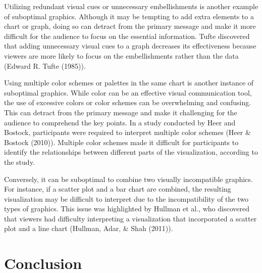 \documentclass[print]{nuthesis}
\begin{document}
Utilizing redundant visual cues or unnecessary embellishments is another example of suboptimal graphics.
Although it may be tempting to add extra elements to a chart or graph, doing so can detract from the primary message and make it more difficult for the audience to focus on the essential information.
Tufte discovered that adding unnecessary visual cues to a graph decreases its effectiveness because viewers are more likely to focus on the embellishments rather than the data (Edward R. Tufte (1985)).

Using multiple color schemes or palettes in the same chart is another instance of suboptimal graphics.
While color can be an effective visual communication tool, the use of excessive colors or color schemes can be overwhelming and confusing.
This can detract from the primary message and make it challenging for the audience to comprehend the key points.
In a study conducted by Heer and Bostock, participants were required to interpret multiple color schemes (Heer \& Bostock (2010)).
Multiple color schemes made it difficult for participants to identify the relationships between different parts of the visualization, according to the study.

Conversely, it can be suboptimal to combine two visually incompatible graphics.
For instance, if a scatter plot and a bar chart are combined, the resulting visualization may be difficult to interpret due to the incompatibility of the two types of graphics.
This issue was highlighted by Hullman et al., who discovered that viewers had difficulty interpreting a visualization that incorporated a scatter plot and a line chart (Hullman, Adar, \& Shah (2011)).

\hypertarget{conclusion}{%
\section{Conclusion}\label{conclusion}}

\end{document}
